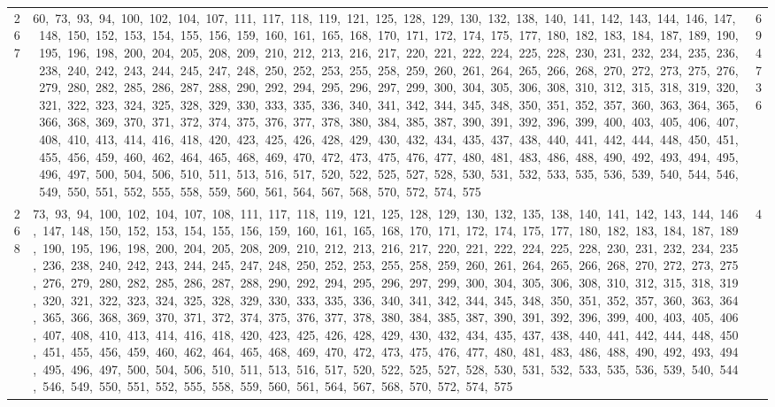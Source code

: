 \begin{longtable}{c|p{}|r}
267 & 60,\ 73,\ 93,\ 94,\ 100,\ 102,\ 104,\ 107,\ 111,\ 117,\ 118,\ 119,\ 121,\ 125,\ 128,\ 129,\ 130,\ 132,\ 138,\ 140,\ 141,\ 142,\ 143,\ 144,\ 146,\ 147,\ 148,\ 150,\ 152,\ 153,\ 154,\ 155,\ 156,\ 159,\ 160,\ 161,\ 165,\ 168,\ 170,\ 171,\ 172,\ 174,\ 175,\ 177,\ 180,\ 182,\ 183,\ 184,\ 187,\ 189,\ 190,\ 195,\ 196,\ 198,\ 200,\ 204,\ 205,\ 208,\ 209,\ 210,\ 212,\ 213,\ 216,\ 217,\ 220,\ 221,\ 222,\ 224,\ 225,\ 228,\ 230,\ 231,\ 232,\ 234,\ 235,\ 236,\ 238,\ 240,\ 242,\ 243,\ 244,\ 245,\ 247,\ 248,\ 250,\ 252,\ 253,\ 255,\ 258,\ 259,\ 260,\ 261,\ 264,\ 265,\ 266,\ 268,\ 270,\ 272,\ 273,\ 275,\ 276,\ 279,\ 280,\ 282,\ 285,\ 286,\ 287,\ 288,\ 290,\ 292,\ 294,\ 295,\ 296,\ 297,\ 299,\ 300,\ 304,\ 305,\ 306,\ 308,\ 310,\ 312,\ 315,\ 318,\ 319,\ 320,\ 321,\ 322,\ 323,\ 324,\ 325,\ 328,\ 329,\ 330,\ 333,\ 335,\ 336,\ 340,\ 341,\ 342,\ 344,\ 345,\ 348,\ 350,\ 351,\ 352,\ 357,\ 360,\ 363,\ 364,\ 365,\ 366,\ 368,\ 369,\ 370,\ 371,\ 372,\ 374,\ 375,\ 376,\ 377,\ 378,\ 380,\ 384,\ 385,\ 387,\ 390,\ 391,\ 392,\ 396,\ 399,\ 400,\ 403,\ 405,\ 406,\ 407,\ 408,\ 410,\ 413,\ 414,\ 416,\ 418,\ 420,\ 423,\ 425,\ 426,\ 428,\ 429,\ 430,\ 432,\ 434,\ 435,\ 437,\ 438,\ 440,\ 441,\ 442,\ 444,\ 448,\ 450,\ 451,\ 455,\ 456,\ 459,\ 460,\ 462,\ 464,\ 465,\ 468,\ 469,\ 470,\ 472,\ 473,\ 475,\ 476,\ 477,\ 480,\ 481,\ 483,\ 486,\ 488,\ 490,\ 492,\ 493,\ 494,\ 495,\ 496,\ 497,\ 500,\ 504,\ 506,\ 510,\ 511,\ 513,\ 516,\ 517,\ 520,\ 522,\ 525,\ 527,\ 528,\ 530,\ 531,\ 532,\ 533,\ 535,\ 536,\ 539,\ 540,\ 544,\ 546,\ 549,\ 550,\ 551,\ 552,\ 555,\ 558,\ 559,\ 560,\ 561,\ 564,\ 567,\ 568,\ 570,\ 572,\ 574,\ 575 & 694736 \\
268 & 73,\ 93,\ 94,\ 100,\ 102,\ 104,\ 107,\ 108,\ 111,\ 117,\ 118,\ 119,\ 121,\ 125,\ 128,\ 129,\ 130,\ 132,\ 135,\ 138,\ 140,\ 141,\ 142,\ 143,\ 144,\ 146,\ 147,\ 148,\ 150,\ 152,\ 153,\ 154,\ 155,\ 156,\ 159,\ 160,\ 161,\ 165,\ 168,\ 170,\ 171,\ 172,\ 174,\ 175,\ 177,\ 180,\ 182,\ 183,\ 184,\ 187,\ 189,\ 190,\ 195,\ 196,\ 198,\ 200,\ 204,\ 205,\ 208,\ 209,\ 210,\ 212,\ 213,\ 216,\ 217,\ 220,\ 221,\ 222,\ 224,\ 225,\ 228,\ 230,\ 231,\ 232,\ 234,\ 235,\ 236,\ 238,\ 240,\ 242,\ 243,\ 244,\ 245,\ 247,\ 248,\ 250,\ 252,\ 253,\ 255,\ 258,\ 259,\ 260,\ 261,\ 264,\ 265,\ 266,\ 268,\ 270,\ 272,\ 273,\ 275,\ 276,\ 279,\ 280,\ 282,\ 285,\ 286,\ 287,\ 288,\ 290,\ 292,\ 294,\ 295,\ 296,\ 297,\ 299,\ 300,\ 304,\ 305,\ 306,\ 308,\ 310,\ 312,\ 315,\ 318,\ 319,\ 320,\ 321,\ 322,\ 323,\ 324,\ 325,\ 328,\ 329,\ 330,\ 333,\ 335,\ 336,\ 340,\ 341,\ 342,\ 344,\ 345,\ 348,\ 350,\ 351,\ 352,\ 357,\ 360,\ 363,\ 364,\ 365,\ 366,\ 368,\ 369,\ 370,\ 371,\ 372,\ 374,\ 375,\ 376,\ 377,\ 378,\ 380,\ 384,\ 385,\ 387,\ 390,\ 391,\ 392,\ 396,\ 399,\ 400,\ 403,\ 405,\ 406,\ 407,\ 408,\ 410,\ 413,\ 414,\ 416,\ 418,\ 420,\ 423,\ 425,\ 426,\ 428,\ 429,\ 430,\ 432,\ 434,\ 435,\ 437,\ 438,\ 440,\ 441,\ 442,\ 444,\ 448,\ 450,\ 451,\ 455,\ 456,\ 459,\ 460,\ 462,\ 464,\ 465,\ 468,\ 469,\ 470,\ 472,\ 473,\ 475,\ 476,\ 477,\ 480,\ 481,\ 483,\ 486,\ 488,\ 490,\ 492,\ 493,\ 494,\ 495,\ 496,\ 497,\ 500,\ 504,\ 506,\ 510,\ 511,\ 513,\ 516,\ 517,\ 520,\ 522,\ 525,\ 527,\ 528,\ 530,\ 531,\ 532,\ 533,\ 535,\ 536,\ 539,\ 540,\ 544,\ 546,\ 549,\ 550,\ 551,\ 552,\ 555,\ 558,\ 559,\ 560,\ 561,\ 564,\ 567,\ 568,\ 570,\ 572,\ 574,\ 575 & 4 \\

\end{longtable}

